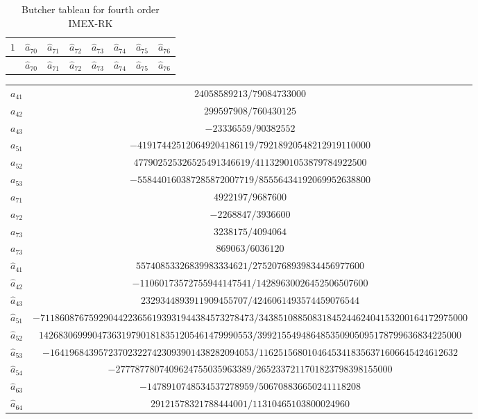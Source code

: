 \documentclass[a4paper, oneside]{book}
\def\hata{{\hat{a}}}
\begin{document}
\begin{itemize}
\begin{table}[h]
\begin{tabular}[h]{c|ccccccc}
        $1$&$\hata_{70}$&$\hata_{71}$&$\hata_{72}$&$\hata_{73}$&$\hata_{74}$&$\hata_{75}$& $\hata_{76}$\\
\hline
~&$\hata_{70}$&$\hata_{71}$&$\hata_{72}$&$\hata_{73}$&$\hata_{74}$&$\hata_{75}$& $\hata_{76}$\\
\end{tabular}
     \caption{{Butcher tableau for fourth order IMEX-RK}}\label{Tab:four_nonlinear}
 \end{table}
 \begin{table}[h] \label{Tab:coef}
    \centering
    \begin{tabular}[h]{|c|c|}
\hline
$a_{41}$ & $24058589213/79084733000$ \\
$a_{42}$ & $299597908/760430125$ \\
$a_{43}$ & $-23336559/90382552$ \\ \hline
$a_{51}$ & $-419174425120649204186119/79218920548212919110000$ \\
$a_{52}$ & $477902525326525491346619/41132901053879784922500$ \\
$a_{53}$ & $-558440160387285872007719/85556434192069952638800$ \\ \hline
$a_{71}$ & $4922197/9687600$ \\
$a_{72}$ & $-2268847/3936600$ \\
$a_{73}$ & $3238175/4094064$ \\
$a_{73}$ & $869063/6036120$ \\\hline
$\hata_{41}$ & $55740853326839983334621/27520768939834456977600$ \\
$\hata_{42}$ & $-11060173572755944147541/14289630026452506507600$ \\
$\hata_{43}$ & $2329344893911909455707/4246061493574459076544$ \\ \hline
$\hata_{51}$ & \scriptsize $-71186087675929044223656193931944384573278473/3438510885083184524462404153200164172975000$ \\
$\hata_{52}$ & \scriptsize $14268306999047363197901818351205461479990553/399215549486485350905095178799636834225000$ \\
$\hata_{53}$ & \scriptsize $-164196843957237023227423093901438282094053/11625156801046453418356371606645424612632$ \\
$\hata_{54}$ &  $-2777877807409624755035963389/2652337211701823798398155000$ \\ \hline
$\hata_{63}$ &  $-1478910748534537278959/506708836650241118208$ \\
$\hata_{64}$ &  $29121578321788444001/11310465103800024960$ \\

\end{tabular}
\end{table}
\end{itemize}
\end{document}
